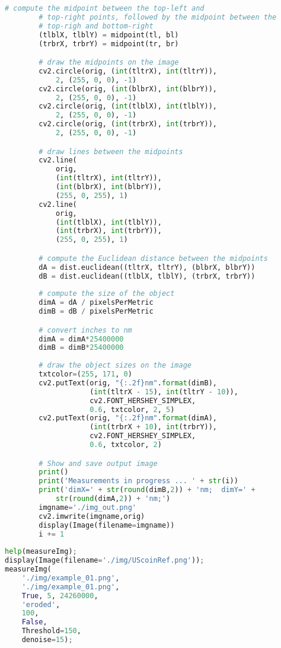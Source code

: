 \begin{lstlisting}[language=Python, caption=Image Analysis Source Code, label=lis:imageAnalysisSourceCode]
        # compute the midpoint between the top-left and
        # top-right points, followed by the midpoint between the 
        # top-righ and bottom-right
        (tlblX, tlblY) = midpoint(tl, bl)
        (trbrX, trbrY) = midpoint(tr, br)

        # draw the midpoints on the image
        cv2.circle(orig, (int(tltrX), int(tltrY)),
            2, (255, 0, 0), -1)
        cv2.circle(orig, (int(blbrX), int(blbrY)),
            2, (255, 0, 0), -1)
        cv2.circle(orig, (int(tlblX), int(tlblY)),
            2, (255, 0, 0), -1)
        cv2.circle(orig, (int(trbrX), int(trbrY)),
            2, (255, 0, 0), -1)

        # draw lines between the midpoints
        cv2.line(
            orig,
            (int(tltrX), int(tltrY)),
            (int(blbrX), int(blbrY)),
            (255, 0, 255), 1)
        cv2.line(
            orig,
            (int(tlblX), int(tlblY)),
            (int(trbrX), int(trbrY)),
            (255, 0, 255), 1)

        # compute the Euclidean distance between the midpoints
        dA = dist.euclidean((tltrX, tltrY), (blbrX, blbrY))
        dB = dist.euclidean((tlblX, tlblY), (trbrX, trbrY))
            
        # compute the size of the object
        dimA = dA / pixelsPerMetric
        dimB = dB / pixelsPerMetric

        # convert inches to nm
        dimA = dimA*25400000
        dimB = dimB*25400000
        
        # draw the object sizes on the image
        txtcolor=(255, 171, 0)
        cv2.putText(orig, "{:.2f}nm".format(dimB),
                    (int(tltrX - 15), int(tltrY - 10)), 
                    cv2.FONT_HERSHEY_SIMPLEX,
                    0.6, txtcolor, 2, 5)
        cv2.putText(orig, "{:.2f}nm".format(dimA),
                    (int(trbrX + 10), int(trbrY)), 
                    cv2.FONT_HERSHEY_SIMPLEX,
                    0.6, txtcolor, 2)

        # Show and save output image
        print()
        print('Measurements in progress ... ' + str(i))
        print('dimX=' + str(round(dimB,2)) + 'nm;  dimY=' + 
            str(round(dimA,2)) + 'nm;')
        imgname='./img_out.png'
        cv2.imwrite(imgname,orig)
        display(Image(filename=imgname))
        i += 1
        
help(measureImg);
display(Image(filename='./img/UScoinRef.png'));
measureImg(
    './img/example_01.png',
    './img/example_01.png',
    True, 5, 24260000,
    'eroded',
    100,
    False,
    Threshold=150,
    denoise=15);
\end{lstlisting}